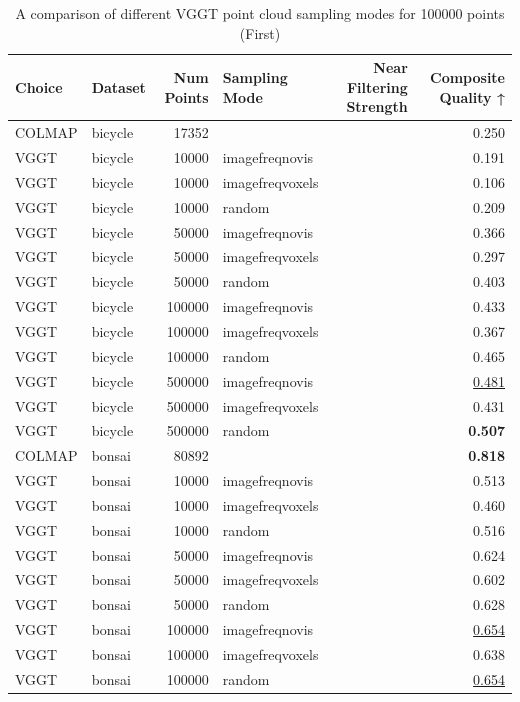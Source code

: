 \begin{table}[H]
\caption{\ifdefined\customcaption \customcaption \else A comparison of different VGGT point cloud sampling modes for 100000 points (First) \fi}
\label{tab:03_sampling_mode_single_first}
\centering
\scriptsize
\begin{tabular}{llrlrr}
\toprule
Choice & Dataset & Num Points & Sampling Mode & Near Filtering Strength & Composite Quality ↑ \\
\midrule
COLMAP & bicycle & 17352 &  &  & 0.250 \\
VGGT & bicycle & 10000 & imagefreqnovis &  & 0.191 \\
VGGT & bicycle & 10000 & imagefreqvoxels &  & 0.106 \\
VGGT & bicycle & 10000 & random &  & 0.209 \\
VGGT & bicycle & 50000 & imagefreqnovis &  & 0.366 \\
VGGT & bicycle & 50000 & imagefreqvoxels &  & 0.297 \\
VGGT & bicycle & 50000 & random &  & 0.403 \\
VGGT & bicycle & 100000 & imagefreqnovis &  & 0.433 \\
VGGT & bicycle & 100000 & imagefreqvoxels &  & 0.367 \\
VGGT & bicycle & 100000 & random &  & 0.465 \\
VGGT & bicycle & 500000 & imagefreqnovis &  & \underline{0.481} \\
VGGT & bicycle & 500000 & imagefreqvoxels &  & 0.431 \\
VGGT & bicycle & 500000 & random &  & \textbf{0.507} \\
\midrule
COLMAP & bonsai & 80892 &  &  & \textbf{0.818} \\
VGGT & bonsai & 10000 & imagefreqnovis &  & 0.513 \\
VGGT & bonsai & 10000 & imagefreqvoxels &  & 0.460 \\
VGGT & bonsai & 10000 & random &  & 0.516 \\
VGGT & bonsai & 50000 & imagefreqnovis &  & 0.624 \\
VGGT & bonsai & 50000 & imagefreqvoxels &  & 0.602 \\
VGGT & bonsai & 50000 & random &  & 0.628 \\
VGGT & bonsai & 100000 & imagefreqnovis &  & \underline{0.654} \\
VGGT & bonsai & 100000 & imagefreqvoxels &  & 0.638 \\
VGGT & bonsai & 100000 & random &  & \underline{0.654} \\

\end{tabular}
\end{table}
